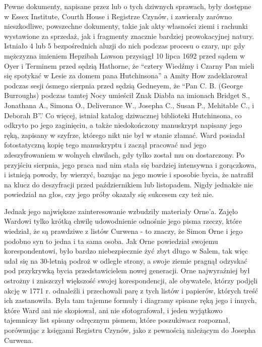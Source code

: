 Pewne dokumenty, napisane przez lub o tych dziwnych sprawach, były dostępne w Essex Institute, Courth House i Registrze Czynów, i zawierały zarówno nieszkodliwe, powszechne dokumenty, takie jak akty własności ziemi i rachunki wystawione za sprzedaż, jak i fragmenty znacznie bardziej prowokacyjnej natury. Istniało 4 lub 5 bezpośrednich aluzji do nich podczas procesu o czary, np: gdy mężczyzna imieniem Hepzibah Lawson przysiągł 10 lipca 1692 przed sądem w Oyer i Terminem przed sędzią Hathorne, że ``cztery Wiedźmy i Czarny Pan mieli się spotykać w Lesie za domem pana Hutchinsona'' a Amity How zadeklarował podczas sesji ósmego sierpnia przed sędzią Gedneyem, że ``Pan C. B. (George Burroughs) podczas tamtej Nocy umieścił Znak Diabła na imionach Bridget S., Jonathana A., Simona O., Deliverance W., Josepha C., Susan P., Mehitable C., i Deborah B''.' Co więcej, istniał katalog dziwacznej biblioteki Hutchinsona, co odkryto po jego zaginięciu, a także niedokończony manuskrypt napisany jego ręką, zapisany w szyfrze, którego nikt nie był w stanie złamać. Ward posiadał fotostatyczną kopię tego manuskryptu i zaczął pracować nad jego zdeszyfrowaniem w wolnych chwilach, gdy tylko został mu on dostarczony. Po przyjściu sierpnia, jego praca nad nim stała się bardziej intensywna i gorączkowa, i istnieją powody, by wierzyć, bazując na jego mowie i sposobie bycia, że natrafił na klucz do deszyfracji przed październikiem lub listopadem. Nigdy jednakże nie powiedział na głos, czy jego próby okazały się sukcesem czy też nie. 

Jednak jego największe zainteresowanie wzbudziły materiały Orne'a. Zajęło Wardowi tylko krótką chwilę udowodnienie odnośnie jego pisma rzeczy, które wiedział, że są prawdziwe z listów Curwena - to znaczy, że Simon Orne i jego podobno syn to jedna i ta sama osoba. Jak Orne powiedział swojemu korespondentowi, było bardzo niebezpiecznie żyć zbyt długo w Salem, tak więc udał się na 30-letnią podroż w odległe strony, a swoje ziemie pragnął odzyskać pod przykrywką bycia przedstawicielem nowej generacji. Orne najwyraźniej był ostrożny i zniszczył większość swojej korespondencji, ale obywatele, którzy podjęli akcję w 1771 r. odnaleźli i przechowali parę z tych listów i papierów, których treść ich zastanowiła. Była tam tajemne formuły i diagramy spisane ręką jego i innych, które Ward ani nie skopiował, ani nie sfotografował, i jeden wyjątkowo tajemniczy list spisany odręcznym pismem, które poszukiwacz rozpoznał, porównując z księgami Registru Czynów, jako z pewnością należącym do Josepha Curwena. 

